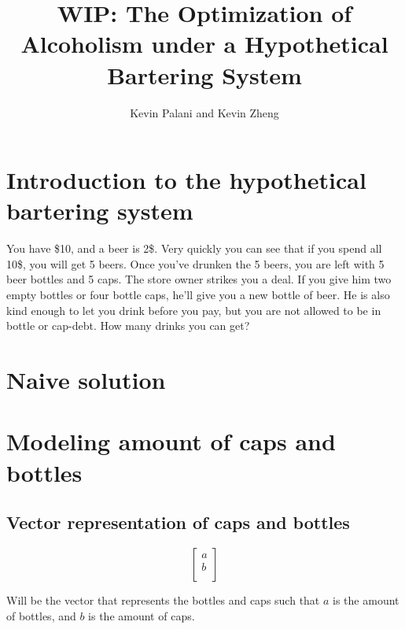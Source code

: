 \documentclass[letterpaper, 12pt]{article}
\title{WIP: The Optimization of Alcoholism under a Hypothetical Bartering System}
\author{Kevin Palani and Kevin Zheng}
\begin{document}
\maketitle
\tableofcontents
\section{Introduction to the hypothetical bartering system}
\par You have \$10, and a beer is 2\$.
Very quickly you can see that if you spend all 10\$, you will get 5 beers.
Once you've drunken the 5 beers, you are left with 5 beer bottles and 5 caps.
The store owner strikes you a deal.
If you give him two empty bottles or four bottle caps, he'll give you a new bottle of beer.
He is also kind enough to let you drink before you pay, but you are not allowed to be in bottle or cap-debt.
How many drinks you can get?
\section{Naive solution}

\section{Modeling amount of caps and bottles}
\subsection{Vector representation of caps and bottles}
\[
    \begin{bmatrix}
        a\\
        b\\
    \end{bmatrix}
\]
\par Will be the vector that represents the bottles and caps such that $a$ is the amount of bottles, and $b$ is the amount of caps.
\end{document}

